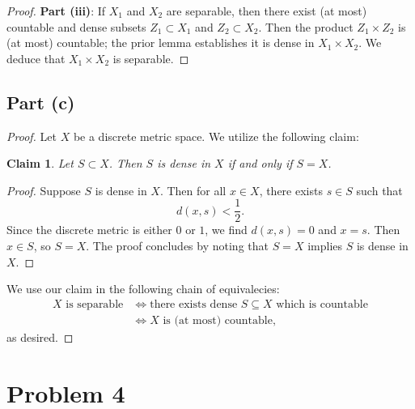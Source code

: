\documentclass[11pt]{article}
\newtheorem{claim}{Claim}
\begin{document}
\begin{proof}
  \textbf{Part (iii)}: If $X_{1}$ and $X_{2}$ are separable, then there exist (at most) countable and dense subsets $Z_{1} \subset X_{1}$ and $Z_{2} \subset X_{2}$. Then the product $Z_{1} \times Z_{2}$ is (at most) countable; the prior lemma establishes it is dense in $X_{1} \times X_{2}$. We deduce that $X_{1} \times X_{2}$ is separable.
\end{proof}


\subsection{Part (c)}

\begin{proof} Let $X$ be a discrete metric space. We utilize the following claim:
  \begin{claim}
    Let $S \subset X$. Then $S$ is dense in $X$ if and only if $S = X$.
  \end{claim}
  \begin{adjustwidth}{1cm}{}
    \begin{proof}\renewcommand{\qedsymbol}{}
      Suppose $S$ is dense in $X$. Then for all $x \in X$, there exists $s \in S$ such that
      \[
        d(x, s) < \frac{1}{2}.
      \]
      Since the discrete metric is either $0$ or $1$, we find $d(x, s) = 0$ and $x = s$. Then $x \in S$, so $S = X$. The proof concludes by noting that $S = X$ implies $S$ is dense in $X$.
    \end{proof}
  \end{adjustwidth}
  We use our claim in the following chain of equivalecies:
  \begin{align*}
    \text{$X$ is separable} &\iff \text{there exists dense $S \subseteq X$ which is countable} \\
                            &\iff \text{$X$ is (at most) countable},
  \end{align*}
  as desired.
\end{proof}


\section{Problem 4}
\end{document}
